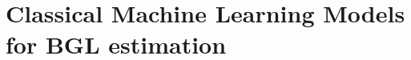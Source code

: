 
\chapter{Classical Machine Learning Models for BGL estimation}
\label{cha:Classical Machine Learning Models for BGL estimation}